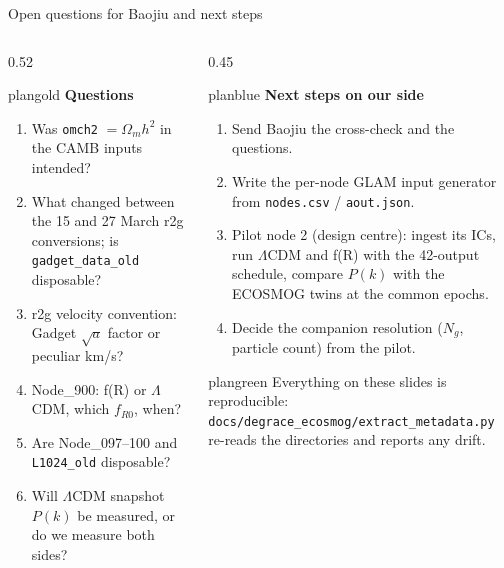 \documentclass[UTF8]{beamer}
\begin{document}
\begin{frame}{Open questions for Baojiu and next steps}
  \footnotesize
  \begin{columns}[T,totalwidth=\textwidth]
    \begin{column}{0.52\textwidth}
      \begin{phasebox}[colback=planpale]{plangold}
        {\color{plangold}\bfseries Questions}\par\smallskip
        \scriptsize
        \begin{enumerate}\setlength\itemsep{0.3em}
          \item Was \texttt{omch2} $= \Omega_m h^2$ in the CAMB inputs intended?
          \item What changed between the 15 and 27 March r2g conversions; is \texttt{gadget\_data\_old} disposable?
          \item r2g velocity convention: Gadget $\sqrt{a}$ factor or peculiar km/s?
          \item Node\_900: f(R) or $\Lambda$CDM, which $f_{R0}$, when?
          \item Are Node\_097--100 and \texttt{L1024\_old} disposable?
          \item Will $\Lambda$CDM snapshot $P(k)$ be measured, or do we measure both sides?
        \end{enumerate}
      \end{phasebox}
    \end{column}
    \hfill
    \begin{column}{0.45\textwidth}
      \begin{phasebox}{planblue}
        {\color{planblue}\bfseries Next steps on our side}\par\smallskip
        \scriptsize
        \begin{enumerate}\setlength\itemsep{0.3em}
          \item Send Baojiu the cross-check and the questions.
          \item Write the per-node GLAM input generator from \texttt{nodes.csv} / \texttt{aout.json}.
          \item Pilot node 2 (design centre): ingest its ICs, run $\Lambda$CDM and f(R) with the 42-output schedule, compare $P(k)$ with the ECOSMOG twins at the common epochs.
          \item Decide the companion resolution ($N_g$, particle count) from the pilot.
        \end{enumerate}
      \end{phasebox}
      \vspace{0.4ex}
      \begin{phasebox}[colback=plangreen!6,top=0.8mm,bottom=0.8mm]{plangreen}
        \scriptsize
        Everything on these slides is reproducible: \texttt{docs/degrace\_ecosmog/extract\_metadata.py} re-reads the directories and reports any drift.
      \end{phasebox}
    \end{column}
  \end{columns}
\end{frame}
\end{document}

